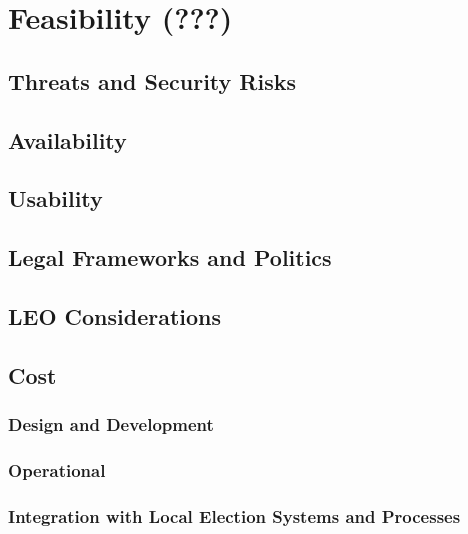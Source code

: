 \chapter{Feasibility (???)}

\section{Threats and Security Risks}
\section{Availability}
\section{Usability}
\section{Legal Frameworks and Politics}
\section{LEO Considerations}
\section{Cost}
\subsection{Design and Development}
\subsection{Operational}
\subsection{Integration with Local Election Systems and Processes}